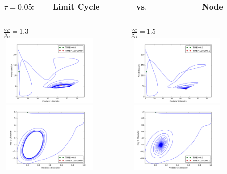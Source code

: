 \documentclass[10pt]{beamer}
\begin{document}
\begin{frame}
	\frametitle{{\small$\tau = 0.05$:}\ \ \ \ Limit Cycle\ \ \ \ \ \ \ \ vs.\ \ \ \ \ \ \ \ \ \ \ \ Node}
	\begin{columns}[t]
		\begin{column}{.5\textwidth}
			\centering
			$\frac{\sigma_G}{\beta_G} = 1.3$\\ \vspace{-1pt}
			\includegraphics[width=5cm,height=3.55cm]{figures/1x1/variable_growth/contour_plots/density_phase_plane_limit_cycle.png}\\
			\includegraphics[width=5cm,height=3.55cm]{figures/1x1/variable_growth/contour_plots/trait_phase_plane_limit_cycle.png}
		\end{column}
		\hspace{-30pt}
		\vrule{}
		\begin{column}{.5\textwidth}
			\centering
			$\frac{\sigma_G}{\beta_G} = 1.5$\\ \vspace{-1pt}
			\includegraphics[width=5cm,height=3.55cm]{figures/1x1/variable_growth/contour_plots/density_phase_plane_node.png}\\
			\includegraphics[width=5cm,height=3.55cm]{figures/1x1/variable_growth/contour_plots/trait_phase_plane_node.png}
		\end{column}
	\end{columns}
\end{frame}
\end{document}
